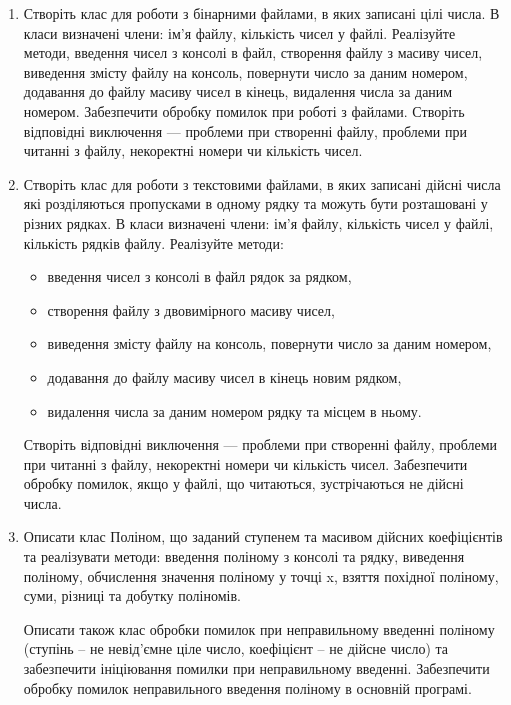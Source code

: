 \documentclass[]{article}
\begin{document}
\begin{enumerate}
\item
Створіть клас для роботи з бінарними файлами, в яких записані цілі числа.
В класи визначені члени: ім'я файлу, кількість чисел у файлі.
Реалізуйте методи, введення чисел з консолі в файл, створення файлу з масиву чисел,
виведення змісту файлу на консоль, повернути число за даним номером, 
додавання до файлу масиву чисел в кінець, видалення числа за даним номером.
Забезпечити обробку помилок при роботі з файлами. 
Створіть відповідні виключення --- проблеми при створенні файлу,
проблеми при читанні з файлу, некоректні номери чи кількість чисел. 

\item
Створіть клас для роботи з текстовими файлами, в яких записані дійсні числа
які розділяються пропусками в одному рядку та можуть бути розташовані у
різних рядках.
В класи визначені члени: ім'я файлу, кількість чисел у файлі, кількість рядків файлу.
Реалізуйте методи:
\begin{itemize}
\item
введення чисел з консолі в файл рядок за рядком, 
\item
створення файлу з двовимірного масиву чисел,
\item
виведення змісту файлу на консоль, повернути число за даним номером, 
\item
додавання до файлу масиву чисел в кінець новим рядком, 
\item
видалення числа за даним номером рядку та місцем в ньому.
\end{itemize}

Створіть відповідні виключення --- проблеми при створенні файлу,
проблеми при читанні з файлу, некоректні номери чи кількість чисел.
Забезпечити обробку помилок, якщо у файлі, що читаються, зустрічаються не дійсні числа.

\item

Описати клас Поліном, що заданий ступенем та масивом дійсних коефіцієнтів
та реалізувати методи: введення поліному з консолі та рядку,
виведення поліному, обчислення значення поліному у точці x, взяття
похідної поліному, суми, різниці та добутку поліномів.

Описати також клас обробки помилок при неправильному введенні поліному
(ступінь -- не невід'ємне ціле число, коефіцієнт -- не дійсне число) та
забезпечити ініціювання помилки при неправильному введенні.
Забезпечити обробку помилок неправильного введення поліному в основній програмі.


\end{enumerate}
\end{document}
